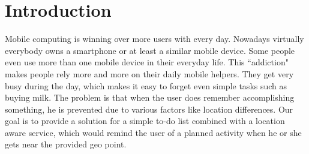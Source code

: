 \section{Introduction}
Mobile computing is winning over more users with every day. Nowadays
virtually everybody owns a smartphone or at least a similar mobile device. Some
people even use more than one mobile device in their everyday life. This
``addiction" makes people rely more and more on their daily mobile helpers.
They get very busy during the day, which makes it easy to forget even simple
tasks such as buying milk. The problem is that when the user does remember
accomplishing something, he is prevented due to various factors like location
differences.
\newline
\newline
Our goal is to provide a solution for a simple to-do list combined with a
location aware service, which would remind the user of a planned activity when
he or she gets near the provided geo point.
